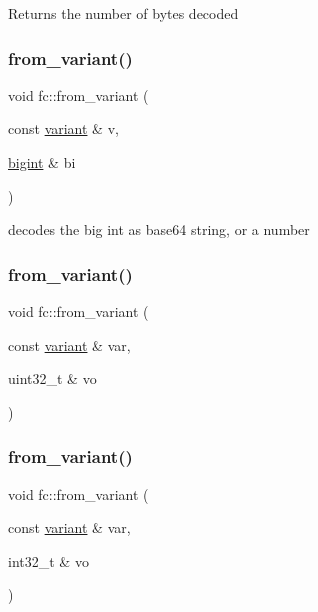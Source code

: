 \begin{DoxyReturn}{Returns}
the number of bytes decoded 
\end{DoxyReturn}
\mbox{\label{namespacefc_ae1624b29ca5721e622d9f2a0775fd07a}} 
\subsubsection{\texorpdfstring{from\+\_\+variant()}{from\_variant()}\hspace{0.1cm}{\footnotesize\ttfamily [1/17]}}
{\footnotesize\ttfamily void fc\+::from\+\_\+variant (\begin{DoxyParamCaption}\item[{const \mbox{\hyperlink{classfc_1_1variant}{variant}} \&}]{v,  }\item[{\mbox{\hyperlink{classfc_1_1bigint}{bigint}} \&}]{bi }\end{DoxyParamCaption})}

decodes the big int as base64 string, or a number \mbox{\label{namespacefc_a46109f579b38c337e6492bc8b4e21f87}} 
\subsubsection{\texorpdfstring{from\+\_\+variant()}{from\_variant()}\hspace{0.1cm}{\footnotesize\ttfamily [2/17]}}
{\footnotesize\ttfamily void fc\+::from\+\_\+variant (\begin{DoxyParamCaption}\item[{const \mbox{\hyperlink{classfc_1_1variant}{variant}} \&}]{var,  }\item[{uint32\+\_\+t \&}]{vo }\end{DoxyParamCaption})}

\mbox{\label{namespacefc_acb9b6c248895ffbe62854128f4fde972}} 
\subsubsection{\texorpdfstring{from\+\_\+variant()}{from\_variant()}\hspace{0.1cm}{\footnotesize\ttfamily [3/17]}}
{\footnotesize\ttfamily void fc\+::from\+\_\+variant (\begin{DoxyParamCaption}\item[{const \mbox{\hyperlink{classfc_1_1variant}{variant}} \&}]{var,  }\item[{int32\+\_\+t \&}]{vo }\end{DoxyParamCaption})}

